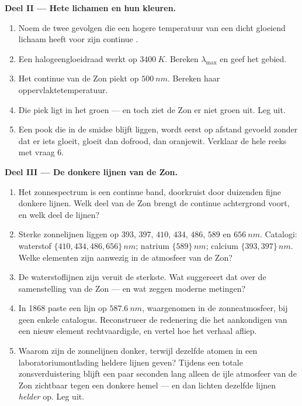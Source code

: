 \begin{problem}
\medskip
\noindent\textbf{Deel II --- Hete lichamen en hun kleuren.}
\begin{enumerate}[resume]
  \item Noem de twee gevolgen die een hogere temperatuur van een dicht
        gloeiend lichaam heeft voor zijn continue .
  \item Een halogeengloeidraad werkt op $\qty{3400}{K}$. Bereken
        $\lambda_{\max}$ en geef het gebied.
  \item Het continue  van de Zon piekt op $\qty{500}{nm}$.
        Bereken haar oppervlaktetemperatuur.
  \item Die piek ligt in het groen --- en toch ziet de Zon er niet groen
        uit. Leg uit.
  \item Een pook die in de smidse blijft liggen, wordt eerst op afstand
        gevoeld zonder dat er iets gloeit, gloeit dan dofrood, dan
        oranjewit. Verklaar de hele reeks met vraag 6.
\end{enumerate}

\medskip
\noindent\textbf{Deel III --- De donkere lijnen van de Zon.}
\begin{enumerate}[resume]
  \item Het zonnespectrum is een continue band, doorkruist door duizenden
        fijne donkere lijnen. Welk deel van de Zon brengt de continue
        achtergrond voort, en welk deel de lijnen?
  \item Sterke zonnelijnen liggen op $393$, $397$, $410$, $434$, $486$,
        $589$ en $\qty{656}{nm}$. Catalogi: waterstof
        $\{410, 434, 486, 656\}\,\unit{nm}$; natrium $\{589\}\,\unit{nm}$;
        calcium $\{393, 397\}\,\unit{nm}$. Welke elementen zijn aanwezig
        in de atmosfeer van de Zon?
  \item De waterstoflijnen zijn veruit de sterkste. Wat suggereert dat
        over de samenstelling van de Zon --- en wat zeggen moderne
        metingen?
  \item In 1868 paste een lijn op $\qty{587.6}{nm}$, waargenomen in de
        zonneatmosfeer, bij geen enkele catalogus. Reconstrueer de
        redenering die het aankondigen van een nieuw element
        rechtvaardigde, en vertel hoe het verhaal afliep.
  \item Waarom zijn de zonnelijnen donker, terwijl dezelfde atomen in een
        laboratoriumontlading heldere lijnen geven? Tijdens een totale
        zonsverduistering blijft een paar seconden lang alleen de ijle
        atmosfeer van de Zon zichtbaar tegen een donkere hemel --- en
        dan lichten dezelfde lijnen \emph{helder} op. Leg uit.
\end{enumerate}


\end{problem}
